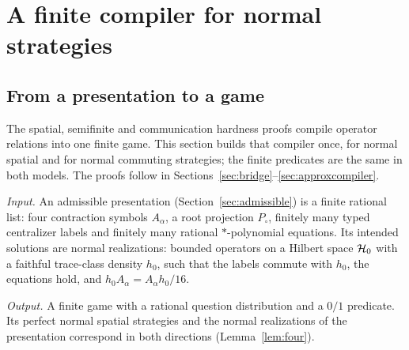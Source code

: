 \section{A finite compiler for normal strategies}\label{sec:compiler}
\subsection*{From a presentation to a game}
The spatial, semifinite and communication hardness proofs compile operator relations into one finite game. This section builds that compiler once, for normal spatial and for normal commuting strategies; the finite predicates are the same in both models. The proofs follow in Sections~\ref{sec:bridge}--\ref{sec:approxcompiler}.

\emph{Input.} An admissible presentation (Section~\ref{sec:admissible}) is a finite rational list: four contraction symbols $A_\alpha$, a root projection $P_\circ$, finitely many typed centralizer labels and finitely many rational $*$-polynomial equations. Its intended solutions are normal realizations: bounded operators on a Hilbert space $\mathcal H_0$ with a faithful trace-class density $h_0$, such that the labels commute with $h_0$, the equations hold, and $h_0A_\alpha=A_\alpha h_0/16$.

\emph{Output.} A finite game with a rational question distribution and a $0/1$ predicate. Its perfect normal spatial strategies and the normal realizations of the presentation correspond in both directions (Lemma~\ref{lem:four}).

